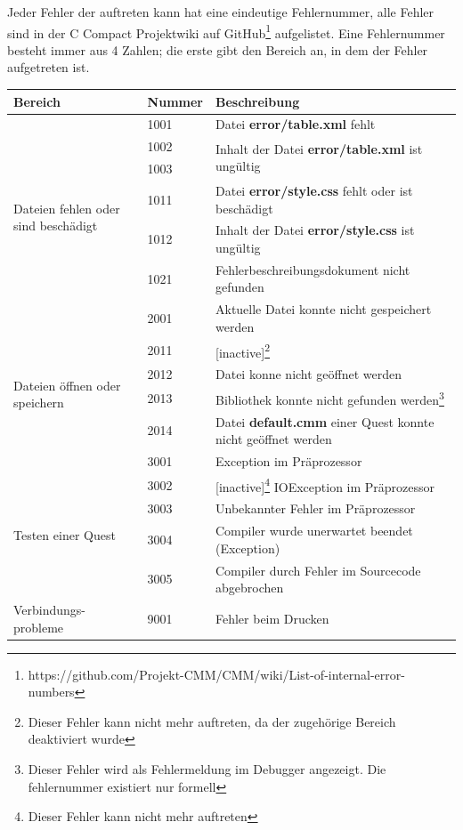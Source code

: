 Jeder Fehler der auftreten kann hat eine eindeutige Fehlernummer, alle Fehler sind in der C Compact Projektwiki auf GitHub\footnote{https://github.com/Projekt-CMM/CMM/wiki/List-of-internal-error-numbers} aufgelistet. Eine Fehlernummer besteht immer aus 4 Zahlen; die erste gibt den Bereich an, in dem der Fehler aufgetreten ist.
\def\arraystretch{1.6}
\begin{minipage}{14cm}
\begin{tabular}{l|l|l}
	Bereich&Nummer&Beschreibung\\
	\hline
	&1001&Datei \textbf{error/table.xml} fehlt\\
	\multirow{5}{15mm}{\begin{sideways}\parbox{35mm}{Dateien fehlen oder sind beschädigt}\end{sideways}}&1002&\multirow{2}{*}{Inhalt der Datei \textbf{error/table.xml} ist ungültig}\\
	&1003&\\
	&1011&Datei \textbf{error/style.css} fehlt oder ist beschädigt\\
	&1012&Inhalt der Datei \textbf{error/style.css} ist ungültig\\
	&1021&Fehlerbeschreibungsdokument nicht gefunden\\
	\hline
	&2001&Aktuelle Datei konnte nicht gespeichert werden\\
	\multirow{4}{15mm}{\begin{sideways}\parbox{25mm}{Dateien öffnen oder speichern}\end{sideways}}&2011&[inactive]\footnote{Dieser Fehler kann nicht mehr auftreten, da der zugehörige Bereich deaktiviert wurde}\\
	&2012&Datei konne nicht geöffnet werden\\
	&2013&Bibliothek konnte nicht gefunden werden\footnote{Dieser Fehler wird als Fehlermeldung im Debugger angezeigt. Die fehlernummer existiert nur formell}\\%
	&2014&Datei \textbf{default.cmm} einer Quest konnte nicht geöffnet werden\\%
	\hline
	&3001&Exception im Präprozessor\\
	\multirow{4}{15mm}{\begin{sideways}\parbox{25mm}{Testen einer Quest}\end{sideways}}&3002&[inactive]\footnote{Dieser Fehler kann nicht mehr auftreten} IOException im Präprozessor\\
	&3003&Unbekannter Fehler im Präprozessor\\
	&3004&Compiler wurde unerwartet beendet (Exception)\\
	&3005&Compiler durch Fehler im Sourcecode abgebrochen\\
	\hline
	\parbox{23mm}{Verbindungs- probleme}&9001&Fehler beim Drucken
\end{tabular}
\end{minipage}

